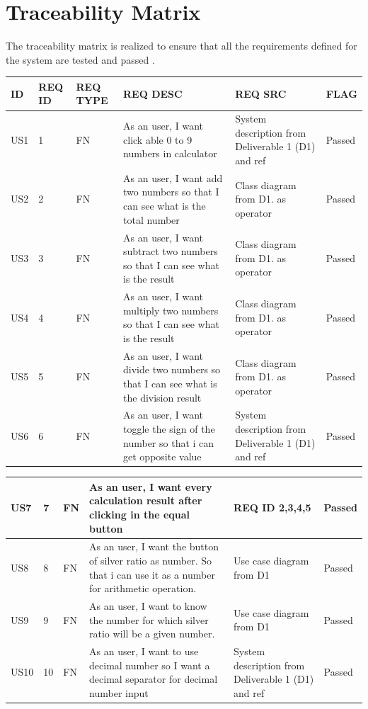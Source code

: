 \documentclass{article}
\begin{document}
\section{Traceability Matrix}

The traceability matrix is realized to ensure that all the requirements defined for the system are tested and passed \cite{prev_project}.\newline

\begin{tabular}{ |p{1cm}|p{1cm}|p{1cm}|p{3cm}|p{3cm}|p{2cm}| }
\hline
 ID & REQ ID & REQ TYPE & REQ DESC & REQ SRC  & FLAG \\
 \hline
  US1 & 1 & FN & As an user, I want click able 0 to
9 numbers in calculator & System description from Deliverable 1 (D1) and ref \cite{js_story} & Passed \\
 \hline
 US2 & 2 & FN & As an user, I want add two numbers so that I can see what is the
total number & Class diagram from D1. as operator & Passed \\
 \hline
 US3 & 3 & FN & As an user, I want subtract two
numbers so that I can see what
is the result & Class diagram from D1. as operator  & Passed \\
 \hline
 US4 & 4 & FN & As an user, I want multiply two
numbers so that I can see what
is the result & Class diagram from D1. as operator  & Passed \\
 \hline
 US5 & 5 & FN & As  an  user,  I  want  divide  two
numbers so that I can see what
is the division result & Class diagram from D1. as operator  & Passed \\
 \hline
 US6 & 6 & FN & As an user, I want toggle the sign
of the number so that i can get
opposite value & System description from Deliverable 1 (D1) and ref \cite{cal_story}  & Passed \\
 
 \hline
\end{tabular}


\begin{tabular}{ |p{1cm}|p{1cm}|p{1cm}|p{3cm}|p{3cm}|p{2cm}| }
\hline
 US7 & 7 & FN & As  an  user,  I  want  every  calculation result after clicking in the
equal button & REQ ID 2,3,4,5  & Passed \\
 \hline
 US8 & 8 & FN & As an user, I want the button of
silver ratio as number.  So that i
can use it as a number for arithmetic operation. & Use case diagram from D1  & Passed \\
 \hline
 US9 & 9 & FN & As an  user,  I want  to know the
number for which silver ratio will
be a given number. & Use case diagram from D1  & Passed \\
 \hline
 US10 & 10 & FN & As an user, I want to use decimal
number so I want a decimal separator for decimal number input & System description from Deliverable 1 (D1) and ref \cite{js_story}  & Passed \\
\hline
\end{tabular}
\printbibliography
\end{document}
